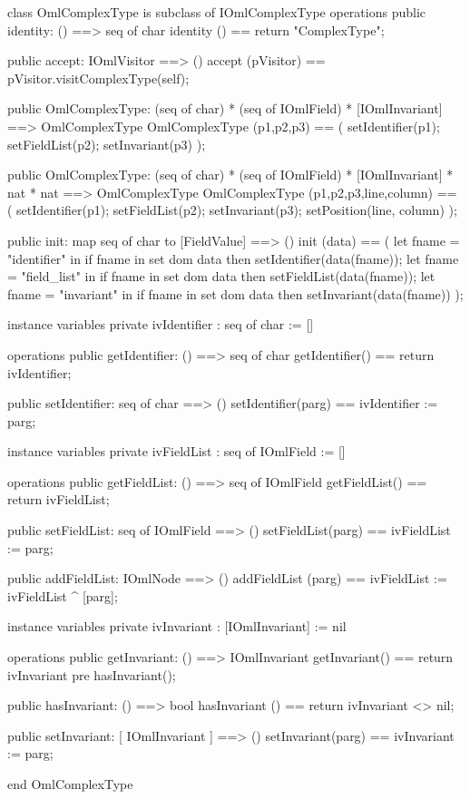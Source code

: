 \begin{vdm_al}
class OmlComplexType is subclass of IOmlComplexType
operations
  public identity: () ==> seq of char
  identity () == return "ComplexType";

  public accept: IOmlVisitor ==> ()
  accept (pVisitor) == pVisitor.visitComplexType(self);

  public OmlComplexType:
    (seq of char) *
    (seq of IOmlField) *
    [IOmlInvariant] ==> OmlComplexType
  OmlComplexType (p1,p2,p3) == 
    ( setIdentifier(p1);
      setFieldList(p2);
      setInvariant(p3) );

  public OmlComplexType:
    (seq of char) *
    (seq of IOmlField) *
    [IOmlInvariant] *
    nat *
    nat ==> OmlComplexType
  OmlComplexType (p1,p2,p3,line,column) == 
    ( setIdentifier(p1);
      setFieldList(p2);
      setInvariant(p3);
      setPosition(line, column) );

  public init: map seq of char to [FieldValue] ==> ()
  init (data) ==
    ( let fname = "identifier" in
        if fname in set dom data
        then setIdentifier(data(fname));
      let fname = "field_list" in
        if fname in set dom data
        then setFieldList(data(fname));
      let fname = "invariant" in
        if fname in set dom data
        then setInvariant(data(fname)) );

instance variables
  private ivIdentifier : seq of char := []

operations
  public getIdentifier: () ==> seq of char
  getIdentifier() == return ivIdentifier;

  public setIdentifier: seq of char ==> ()
  setIdentifier(parg) == ivIdentifier := parg;

instance variables
  private ivFieldList : seq of IOmlField := []

operations
  public getFieldList: () ==> seq of IOmlField
  getFieldList() == return ivFieldList;

  public setFieldList: seq of IOmlField ==> ()
  setFieldList(parg) == ivFieldList := parg;

  public addFieldList: IOmlNode ==> ()
  addFieldList (parg) == ivFieldList := ivFieldList ^ [parg];

instance variables
  private ivInvariant : [IOmlInvariant] := nil

operations
  public getInvariant: () ==> IOmlInvariant
  getInvariant() == return ivInvariant
    pre hasInvariant();

  public hasInvariant: () ==> bool
  hasInvariant () == return ivInvariant <> nil;

  public setInvariant: [ IOmlInvariant ] ==> ()
  setInvariant(parg) == ivInvariant := parg;

end OmlComplexType
\end{vdm_al}

